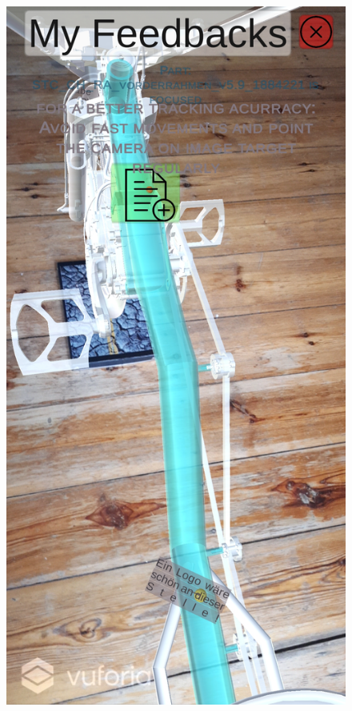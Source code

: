 \begin{figure}[H]
\begin{minipage}{.45\textwidth}
		\includegraphics[width=.95\linewidth]{resources/implementation/annocreate.jpg}
		\label{fig:createdigi}
	\end{minipage}
\end{figure}

